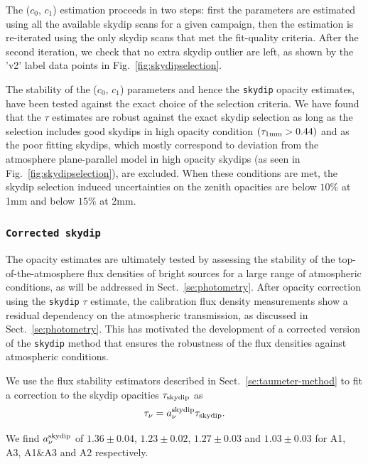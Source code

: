 The ($c_0$, $c_1$) estimation proceeds in two steps: first the
parameters are estimated using all the available skydip scans for a
given campaign, then the estimation is re-iterated using the only
skydip scans that met the fit-quality criteria. After the second
iteration, we check that no extra skydip outlier are left, as shown by
the 'v2' label data points in Fig.~\ref{fig:skydipselection}.

The stability of the ($c_0$, $c_1$) parameters and hence the
{\tt skydip} opacity estimates, have been tested against the
exact choice of the selection criteria. We have found that the $\tau$
estimates are robust against the exact skydip selection as long as the
selection includes good skydips in high opacity condition
$(\tau_{1\rm{mm}} > 0.44)$ and as the poor
fitting skydips, which mostly correspond to deviation from the
atmosphere plane-parallel model in high opacity skydips (as seen in
Fig.~\ref{fig:skydipselection}), are excluded. When these conditions
are met, the skydip selection induced uncertainties on the zenith
opacities are below $10\%$ at 1mm and below $15\%$ at 2mm.  

\subsubsection{{\tt Corrected skydip}}
\label{se:corrected-skydip}
The opacity estimates are ultimately tested by assessing the
stability of the top-of-the-atmosphere flux densities of bright sources for a large
range of atmospheric conditions, as will be addressed in
Sect.~\ref{se:photometry}. After opacity correction using the
{\tt skydip} $\tau$ estimate, the calibration flux density
measurements show a residual dependency on the atmospheric
transmission, as discussed in Sect.~\ref{se:photometry}. This has
motivated the development of a corrected version of the {\tt skydip}
method that ensures the robustness of the flux densities against
atmospheric conditions.

We use the flux stability estimators described in
Sect.~\ref{se:taumeter-method} to fit a correction to the skydip
opacities $\tau_{\rm{skydip}}$ as
\begin{equation}  
  \tau_\nu =  a_\nu^{\rm{skydip}}\tau_{\rm{skydip}}.
  \label{eq:corrected_skydip}
\end{equation}

We find $a_\nu^{\rm{skydip}}$ of
$1.36 \pm 0.04$,
$1.23 \pm 0.02$,
$1.27 \pm 0.03$ and
$1.03 \pm 0.03$ for A1, A3, A1$\&$A3 and A2 respectively.


